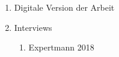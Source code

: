 \section*{\appendixHeading}

\begin{enumerate}
\item Digitale Version der Arbeit
\item Interviews
\begin{enumerate}
\item Expertmann 2018
\end{enumerate}
\end{enumerate}
